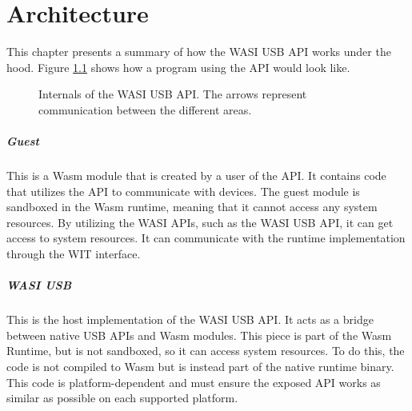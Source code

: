 \chapter{Architecture}

This chapter presents a summary of how the \acrshort{WASI} \acrshort{USB} \acrshort{API} works under the hood.
Figure \ref{image:api_areas} shows how a program using the API would look like.

\begin{figure}[!h]
\centering
{}
\caption{Internals of the WASI USB API. The arrows represent communication between the different areas.}
\label{image:api_areas}
\end{figure}

\paragraph{Guest} This is a \acrshort{Wasm} module that is created by a user of the \acrshort{API}. It contains code that utilizes the \acrshort{API} to communicate with devices. The guest module is sandboxed in the \acrshort{Wasm} runtime, meaning that it cannot access any system resources. By utilizing the \acrshort{WASI} \acrshort{API}s, such as the \acrshort{WASI} \acrshort{USB} \acrshort{API}, it can get access to system resources. It can communicate with the runtime implementation through the \acrshort{WIT} interface.

\paragraph{WASI USB} This is the host implementation of the \acrshort{WASI} \acrshort{USB} \acrshort{API}. It acts as a bridge between native \acrshort{USB} \acrshort{API}s and \acrshort{Wasm} modules. This piece is part of the \acrshort{Wasm} Runtime, but is not sandboxed, so it can access system resources. To do this, the code is not compiled to \acrshort{Wasm} but is instead part of the native runtime binary. This code is platform-dependent and must ensure the exposed API works as similar as possible on each supported platform.


